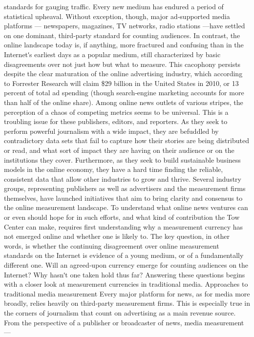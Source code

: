 standards for gauging traffic.
Every new medium has endured a period of statistical upheaval. Without
exception, though, major ad‐supported media platforms — newspapers,
magazines, TV networks, radio stations —have settled on one dominant,
third‐party standard for counting audiences. In contrast, the online
landscape today is, if anything, more fractured and confusing than in the
Internetʹs earliest days as a popular medium, still characterized by basic
disagreements over not just how but what to measure. This cacophony
persists despite the clear maturation of the online advertising industry,
which according to Forrester Research will claim \$29 billion in the United
States in 2010, or 13 percent of total ad spending (though search‐engine
marketing accounts for more than half of the online share).
Among online news outlets of various stripes, the perception of a chaos of
competing metrics seems to be universal. This is a troubling issue for these
publishers, editors, and reporters. As they seek to perform powerful
journalism with a wide impact, they are befuddled by contradictory data
sets that fail to capture how their stories are being distributed or read, and
what sort of impact they are having on their audience or on the
institutions they cover. Furthermore, as they seek to build sustainable
business models in the online economy, they have a hard time finding the
reliable, consistent data that allow other industries to grow and thrive.
Several industry groups, representing publishers as well as advertisers
and the measurement firms themselves, have launched initiatives that aim
to bring clarity and consensus to the online measurement landscape. To
understand what online news ventures can or even should hope for in
such efforts, and what kind of contribution the Tow Center can make,
requires first understanding why a measurement currency has not
emerged online and whether one is likely to.
The key question, in other words, is whether the continuing disagreement
over online measurement standards on the Internet is evidence of a young
medium, or of a fundamentally different one. Will an agreed‐upon
currency emerge for counting audiences on the Internet? Why hasnʹt one
taken hold thus far? Answering these questions begins with a closer look
at measurement currencies in traditional media.
Approaches to traditional media measurement
Every major platform for news, as for media more broadly, relies heavily
on third‐party measurement firms. This is especially true in the corners of
journalism that count on advertising as a main revenue source. From the
perspective of a publisher or broadcaster of news, media measurement —
